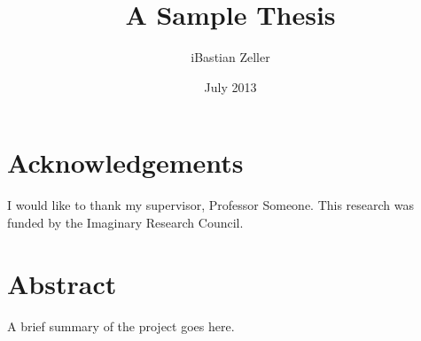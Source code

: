 \documentclass[oneside]{scrbook}
\title{A Sample Thesis}
\author{iBastian Zeller}
\date{July 2013}
\begin{document}
 
\maketitle 

\frontmatter 
\tableofcontents 
\listoffigures 
\listoftables 

\chapter{Acknowledgements} 

I would like to thank my supervisor, Professor Someone. This 
research was funded by the Imaginary Research Council. 

\chapter{Abstract} 

A brief summary of the project goes here. 

\mainmatter 

 
 
 
 
 

\backmatter 
\end{document}
